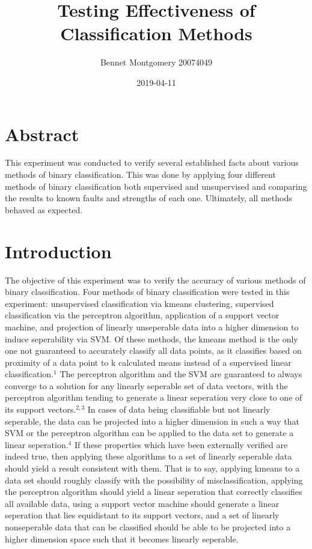 \documentclass{article}
\title{Testing Effectiveness of Classification Methods}
\author{Bennet Montgomery 20074049}
\date{2019-04-11}
\begin{document}
	\maketitle
	\section*{Abstract}
	This experiment was conducted to verify several established facts about various methods of binary classification. This was done by applying four different methods of binary classification both supervised and unsupervised and comparing the results to known faults and strengths of each one. Ultimately, all methods behaved as expected. 
	\section*{Introduction}
	The objective of this experiment was to verify the accuracy of various methods of binary classification. Four methods of binary classification were tested in this experiment: unsupervised classification via kmeans clustering, supervised classification via the perceptron algorithm, application of a support vector machine, and projection of linearly unseperable data into a higher dimension to induce seperability via SVM. Of these methods, the kmeans method is the only one not guaranteed to accurately classify all data points, as it classifies based on proximity of a data point to k calculated means instead of a supervised linear classification.$^{1}$ The perceptron algorithm and the SVM are guaranteed to always converge to a solution for any linearly seperable set of data vectors, with the perceptron algorithm tending to generate a linear seperation very close to one of its support vectors.$^{2, 3}$ In cases of data being classifiable but not linearly seperable, the data can be projected into a higher dimension in such a way that SVM or the perceptron algorithm can be applied to the data set to generate a linear seperation.$^4$ If these properties which have been externally verified are indeed true, then applying these algorithms to a set of linearly seperable data should yield a result consistent with them. That is to say, applying kmeans to a data set should roughly classify with the possibility of misclassification, applying the perceptron algorithm should yield a linear seperation that correctly classifies all available data, using a support vector machine should generate a linear seperation that lies equidistant to its support vectors, and a set of linearly nonseperable data that can be classified should be able to be projected into a higher dimension space such that it becomes linearly seperable. 
\end{document}
